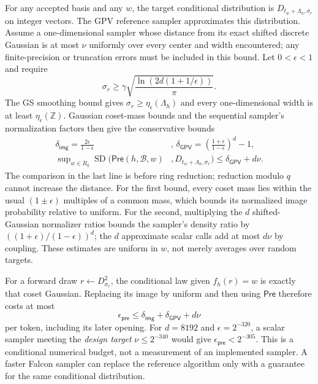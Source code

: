 \documentclass[lettersize,journal]{IEEEtran}
\begin{document}
For any accepted basis and any $w$, the target conditional distribution is
$D_{t_w+\Lambda_h,\sigma_r}$ on integer vectors. The GPV reference sampler approximates this distribution. Assume a one-dimensional
sampler whose distance from its exact shifted discrete Gaussian is at
most $\nu$ uniformly over every center and width encountered; any
finite-precision or truncation errors must be included in this bound.
Let $0<\epsilon<1$ and require
\[
\sigma_r\geq\gamma
\sqrt{\frac{\ln(2d(1+1/\epsilon))}{\pi}}.
\]
The GS smoothing bound gives
$\sigma_r\geq\eta_\epsilon(\Lambda_h)$ and every one-dimensional
width is at least $\eta_\epsilon(\mathbb Z)$. Gaussian coset-mass
bounds and the sequential sampler's normalization factors then give
the conservative bounds
\[
\begin{aligned}
\delta_{\mathsf{img}}=\frac{2\epsilon}{1-\epsilon}&,\,
\delta_{\mathsf{GPV}}=\left(\frac{1+\epsilon}{1-\epsilon}\right)^d-1,\\
\sup\nolimits_{w\in R_q}\operatorname{SD}\bigl(
 \mathsf{Pre}(h,\mathcal B,w)&,
 D_{t_w+\Lambda_h,\sigma_r}\bigr)
 \leq\delta_{\mathsf{GPV}}+d\nu.
\end{aligned}
\]
The comparison in the last line is before ring reduction; reduction
modulo $q$ cannot increase the distance. For the first bound, every
coset mass lies within the usual $(1\pm\epsilon)$ multiples of a
common mass, which bounds its normalized image probability relative
to uniform. For the second, multiplying the $d$ shifted-Gaussian
normalizer ratios bounds the sampler's density ratio by
$((1+\epsilon)/(1-\epsilon))^d$; the $d$ approximate scalar calls
add at most $d\nu$ by coupling. These estimates are uniform in $w$,
not merely averages over random targets.

For a forward draw $r\leftarrow D_{\sigma_r}^{2}$, the conditional
law given $f_h(r)=w$ is exactly that coset Gaussian. Replacing its
image by uniform and then using $\mathsf{Pre}$ therefore costs at most
\[
\epsilon_{\mathsf{pre}}
\leq\delta_{\mathsf{img}}+\delta_{\mathsf{GPV}}+d\nu
\]
per token, including its later opening. For $d=8192$ and
$\epsilon=2^{-320}$, a scalar sampler meeting the \emph{design target}
$\nu\leq2^{-340}$ would give $\epsilon_{\mathsf{pre}}<2^{-305}$.
This is a conditional numerical budget, not a measurement of an
implemented sampler. A faster Falcon sampler can replace the reference
algorithm only with a guarantee for the same conditional distribution.
\end{document}
